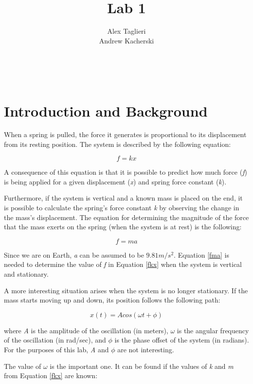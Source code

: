 \documentclass[]{article}
\title{Lab 1}
\author{
	Alex Taglieri
	\\
	Andrew Kacherski
	}
\begin{document}
\maketitle
\newpage
\
\raggedright


\section{Introduction and Background}
When a spring is pulled, the force it generates is proportional to its displacement from its resting position. The system is described by the following equation:

\begin{equation}\label{fkx}
f=kx
\end{equation}

A consequence of this equation is that it is possible to predict how much force (\textit{f}) is being applied for a given displacement (\textit{x}) and spring force constant (\textit{k}). 

Furthermore, if the system is vertical and a known mass is placed on the end, it is possible to calculate the spring's force constant \textit{k} by observing the change in the mass's displacement. The equation for determining the magnitude of the force that the mass exerts on the spring (when the system is at rest) is the following:

\begin{equation}\label{fma}
f=ma
\end{equation}

Since we are on Earth, \textit{a} can be assumed to be $9.81m/s^2$. Equation \ref{fma} is needed to determine the value of \textit{f} in Equation \ref{fkx} when the system is vertical and stationary.

A more interesting situation arises when the system is no longer stationary. If the mass starts moving up and down, its position follows the following path:

\begin{equation}\label{shm}
x(t)=Acos(\omega t + \phi)
\end{equation}

where \textit{A} is the amplitude of the oscillation (in meters), \textit{$\omega$} is the angular frequency of the oscillation (in rad/sec), and \textit{$\phi$} is the phase offset of the system (in radians). For the purposes of this lab, \textit{A} and \textit{$\phi$} are not interesting.

The value of \textit{$\omega$} is the important one. It can be found if the values of \textit{k} and \textit{m} from Equation \ref{fkx} are known:
\end{document}
